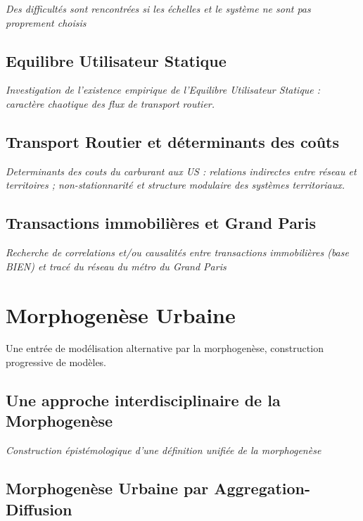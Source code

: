 \textit{Des difficultés sont rencontrées si les échelles et le système ne sont pas proprement choisis}

\subsection{Equilibre Utilisateur Statique}

\textit{Investigation de l'existence empirique de l'Equilibre Utilisateur Statique : caractère chaotique des flux de transport routier.}


\subsection{Transport Routier et déterminants des coûts}

\textit{Determinants des couts du carburant aux US : relations indirectes entre réseau et territoires ; non-stationnarité et structure modulaire des systèmes territoriaux.}





\subsection{Transactions immobilières et Grand Paris}

\textit{Recherche de correlations et/ou causalités entre transactions immobilières (base BIEN) et tracé du réseau du métro du Grand Paris}



\section{Morphogenèse Urbaine}

{\color{blue}Une entrée de modélisation alternative par la morphogenèse, construction progressive de modèles.}

\subsection{Une approche interdisciplinaire de la Morphogenèse}

\textit{Construction épistémologique d'une définition unifiée de la morphogenèse}


\subsection{Morphogenèse Urbaine par Aggregation-Diffusion}

